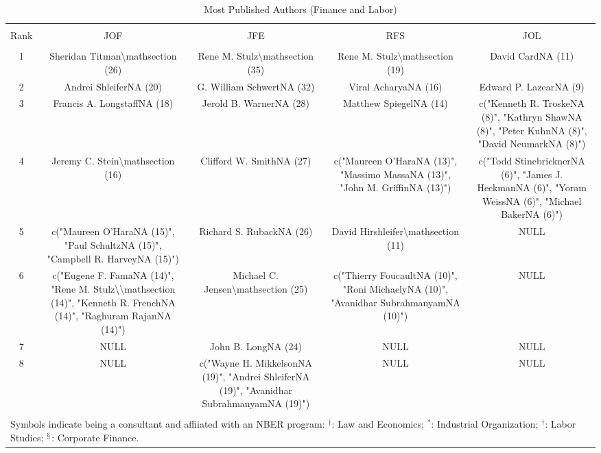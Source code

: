 
\begin{table}[!htbp] \centering 
  \caption{Most Published Authors (Finance and Labor)} 
  \label{} 
\footnotesize 
\begin{tabular}{@{\extracolsep{5pt}} ccccc} 
\\[-1.8ex]\hline 
\hline \\[-1.8ex] 
Rank & JOF & JFE & RFS & JOL \\ 
\hline \\[-1.8ex] 
1 & Sheridan Titman\textbackslash mathsection (26) & Rene M. Stulz\textbackslash mathsection (35) & Rene M. Stulz\textbackslash mathsection (19) & David CardNA (11) \\ 
2 & Andrei ShleiferNA (20) & G. William SchwertNA (32) & Viral AcharyaNA (16) & Edward P. LazearNA (9) \\ 
3 & Francis A. LongstaffNA (18) & Jerold B. WarnerNA (28) & Matthew SpiegelNA (14) & c("Kenneth R. TroskeNA (8)", "Kathryn ShawNA (8)", "Peter KuhnNA (8)", "David NeumarkNA (8)") \\ 
4 & Jeremy C. Stein\textbackslash mathsection (16) & Clifford W. SmithNA (27) & c("Maureen O'HaraNA (13)", "Massimo MassaNA (13)", "John M. GriffinNA (13)") & c("Todd StinebricknerNA (6)", "James J. HeckmanNA (6)", "Yoram WeissNA (6)", "Michael BakerNA (6)") \\ 
5 & c("Maureen O'HaraNA (15)", "Paul SchultzNA (15)", "Campbell R. HarveyNA (15)") & Richard S. RubackNA (26) & David Hirshleifer\textbackslash mathsection (11) & NULL \\ 
6 & c("Eugene F. FamaNA (14)", "Rene M. Stulz\textbackslash \textbackslash mathsection (14)", "Kenneth R. FrenchNA (14)", "Raghuram RajanNA (14)") & Michael C. Jensen\textbackslash mathsection (25) & c("Thierry FoucaultNA (10)", "Roni MichaelyNA (10)", "Avanidhar SubrahmanyamNA (10)") & NULL \\ 
7 & NULL & John B. LongNA (24) & NULL & NULL \\ 
8 & NULL & c("Wayne H. MikkelsonNA (19)", "Andrei ShleiferNA (19)", "Avanidhar SubrahmanyamNA (19)") & NULL & NULL \\ 
\hline \\[-1.8ex] 
\multicolumn{5}{l}{Symbols indicate being a consultant and affiiated with an NBER program: $^{\dag}$: Law and Economics; $^{*}$: Industrial Organization; $^{\dag}$: Labor Studies; $^{\mathsection}$: Corporate Finance.} \\ 
\end{tabular} 
\end{table} 

